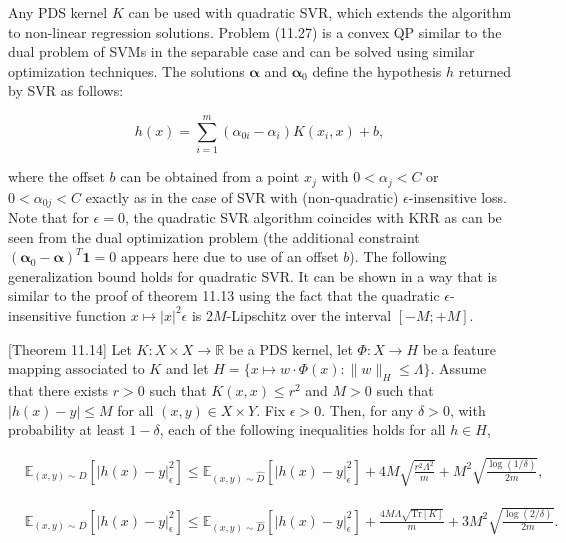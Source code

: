 \documentclass[fleqn,10pt]{olplainarticle}
\begin{document}
Any PDS kernel \(K\) can be used with quadratic SVR, which extends the algorithm to non-linear regression solutions. Problem (11.27) is a convex QP similar to the dual problem of SVMs in the separable case and can be solved using similar optimization techniques. The solutions \(\boldsymbol{\alpha}\) and \(\boldsymbol{\alpha}_0\) define the hypothesis \(h\) returned by SVR as follows:

\[
h(x) = \sum_{i=1}^{m} (\alpha_{0i} - \alpha_i)K(x_i, x) + b,
\]

where the offset \(b\) can be obtained from a point \(x_j\) with \(0 < \alpha_j < C\) or \(0 < \alpha_{0j} < C\) exactly as in the case of SVR with (non-quadratic) \(\epsilon\)-insensitive loss. Note that for \(\epsilon = 0\), the quadratic SVR algorithm coincides with KRR as can be seen from the dual optimization problem (the additional constraint \((\boldsymbol{\alpha}_0 - \boldsymbol{\alpha})^T \boldsymbol{1} = 0\) appears here due to use of an offset \(b\)). The following generalization bound holds for quadratic SVR. It can be shown in a way that is similar to the proof of theorem 11.13 using the fact that the quadratic \(\epsilon\)-insensitive function \(x \mapsto |x|^2 \epsilon\) is \(2M\)-Lipschitz over the interval \([-M;+M]\).

[Theorem 11.14] Let \(K : X \times X \to \mathbb{R}\) be a PDS kernel, let \(\Phi : X \to H\) be a feature mapping associated to \(K\) and let \(H = \{x \mapsto w \cdot \Phi(x) : \|w\|_H \leq \Lambda\}\). Assume that there exists \(r > 0\) such that \(K(x, x) \leq r^2\) and \(M > 0\) such that \(|h(x) - y| \leq M\) for all \((x, y) \in X \times Y\). Fix \(\epsilon > 0\). Then, for any \(\delta > 0\), with probability at least \(1 - \delta\), each of the following inequalities holds for all \(h \in H\),

\[
\begin{aligned}
    &\mathbb{E}_{(x,y) \sim D} \left[ |h(x) - y|^2_\epsilon \right] \leq \mathbb{E}_{(x,y) \sim \hat{D}} \left[ |h(x) - y|^2_\epsilon \right] + 4M \sqrt{\frac{r^2 \Lambda^2}{m}} + M^2\sqrt{\frac{\log(1/\delta)}{2m}} ,
\end{aligned}
\]

\[
\begin{aligned}
    &\mathbb{E}_{(x,y) \sim D} \left[ |h(x) - y|^2_\epsilon \right] \leq \mathbb{E}_{(x,y) \sim \hat{D}} \left[ |h(x) - y|^2_\epsilon \right] + \frac{4M\Lambda \sqrt{\text{Tr}[K]}}{m} + 3M^2 \sqrt{\frac{\log(2/\delta)}{2m}}.
\end{aligned}
\]
\end{document}
